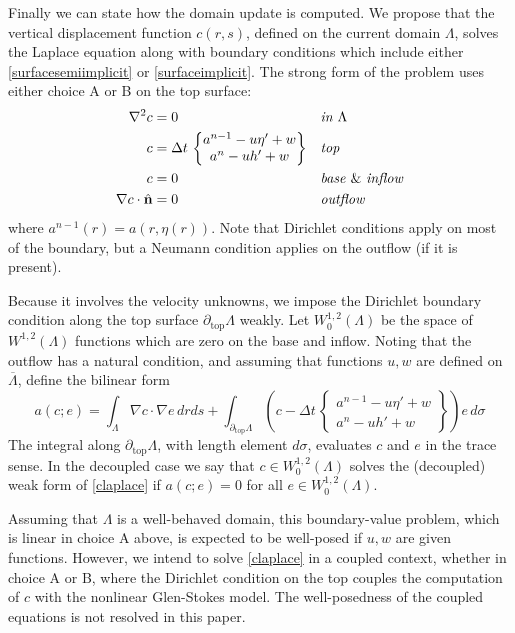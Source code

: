 \documentclass[letterpaper,final,12pt,reqno]{amsart}
\newcommand{\grad}{\nabla}
\newcommand{\hbn}{\hat{\mathbf{n}}}
\begin{document}
Finally we can state how the domain update is computed.  We propose that the vertical displacement function $c(r,s)$, defined on the current domain $\Lambda$, solves the Laplace equation along with boundary conditions which include either \eqref{surfacesemiimplicit} or \eqref{surfaceimplicit}.  The strong form of the problem uses either choice A or B on the top surface:
\begin{align}
        \grad^2 c &= 0 &&\emph{in } \Lambda \label{claplace} \\
                c &= \Delta t\,\begin{Bmatrix} a^{n-1} - u \eta' + w \\ a^n - u h' + w \end{Bmatrix} &&\emph{top} \notag \\
                c &= 0 &&\text{\emph{base} \& \emph{inflow}} \notag \\
\grad c\cdot \hbn &= 0 &&\emph{outflow} \notag
\end{align}
where $a^{n-1}(r) = a(r,\eta(r))$.  Note that Dirichlet conditions apply on most of the boundary, but a Neumann condition applies on the outflow (if it is present).

Because it involves the velocity unknowns, we impose the Dirichlet boundary condition along the top surface $\partial_{\text{top}} \Lambda$ weakly.  Let $W_0^{1,2}(\Lambda)$ be the space of $W^{1,2}(\Lambda)$ functions which are zero on the base and inflow.  Noting that the outflow has a natural condition, and assuming that functions $u,w$ are defined on $\overline\Lambda$, define the bilinear form
\begin{equation}
a(c;e) = \int_\Lambda \grad c \cdot \grad e \,dr ds + \int_{\partial_{\text{top}} \Lambda} \left(c - \Delta t\,\begin{Bmatrix} a^{n-1} - u \eta' + w \\ a^n - u h' + w \end{Bmatrix}\right) e\,d\sigma \label{surfaceweakform}
\end{equation}
The integral along $\partial_{\text{top}} \Lambda$, with length element $d\sigma$, evaluates $c$ and $e$ in the trace sense.  In the decoupled case we say that $c \in W_0^{1,2}(\Lambda)$ solves the (decoupled) weak form of \eqref{claplace} if $a(c;e)=0$ for all $e \in W_0^{1,2}(\Lambda)$.

Assuming that $\Lambda$ is a well-behaved domain, this boundary-value problem, which is linear in choice A above, is expected to be well-posed if $u,w$ are given functions.  However, we intend to solve \eqref{claplace} in a coupled context, whether in choice A or B, where the Dirichlet condition on the top couples the computation of $c$ with the nonlinear Glen-Stokes model.  The well-posedness of the coupled equations is not resolved in this paper.
\end{document}
